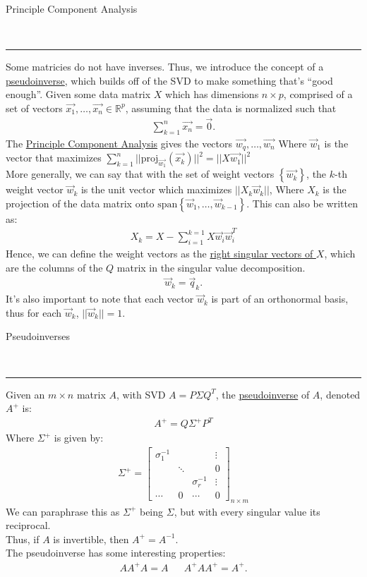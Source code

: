 \documentclass{article}
\newcommand{\header}[1]{\begin{large}\noindent #1\end{large}\\\rule{\textwidth}{0.5pt}}
\newcommand{\gap}{\medskip\\}
\newcommand{\curly}[1]{\left\{#1\right\}}
\newcommand{\proj}[2]{{}\textrm{proj}_{#1}\left(#2\right)}
\begin{document}
\header{Principle Component Analysis}
Some matricies do not have inverses. Thus, we introduce the concept of a \underline{pseudoinverse},
which builds off of the SVD to make something that's ``good enough''.
Given some data matrix $X$ which has dimensions $n \times p$,
comprised of a set of vectors $\vec{x_1}, \ldots, \vec{x_n} \in \mathbb{R}^p$, assuming that the 
data is normalized such that 
\begin{align*}
    \sum_{k = 1}^n \vec{x_n} = \vec{0}.
\end{align*}
The \underline{Principle Component Analysis} gives the vectors $\vec{w_q}, \ldots, \vec{w_n}$
Where $\vec{w}_1$ is the vector that maximizes $\sum_{k = 1}^n ||\proj{\vec{w_1}}{\vec{x_k}}||^2 = ||X\vec{w_1}||^2$
\gap
More generally, we can say that with the set of weight vectors $\curly{\vec{w_k}}$,
the $k$-th weight vector $\vec{w}_k$ is the unit vector which maximizes $||X_k \vec{w}_k||$,
Where $X_k$ is the projection of the data matrix onto $\textrm{span}\curly{\vec{w}_1, \ldots, \vec{w}_{k - 1}}$.
This can also be written as:
\begin{align*}
    X_k = X - \sum_{i = 1}^{k = 1} X\vec{w}_i \vec{w}_i^T
\end{align*}
Hence, we can define the weight vectors as the \underline{right singular vectors of $X$}, 
which are the columns of the $Q$ matrix in the singular value decomposition.
\begin{align*}
    \vec{w}_k = \vec{q}_k.
\end{align*}
It's also important to note that each vector $\vec{w}_k$ is part of an orthonormal basis,
thus for each $\vec{w}_k$, $||\vec{w}_k|| = 1$.
\gap
\header{Pseudoinverses}

Given an $m \times n$ matrix $A$, with SVD $A = P\Sigma Q^T$, the \underline{pseudoinverse}
of $A$, denoted $A^+$ is:
\begin{align*}
    A^+ = Q \Sigma^+ P^T
\end{align*}
Where $\Sigma^+$ is given by:
\begin{align*}
    \Sigma^+ = \begin{bmatrix}
        \sigma_1^{-1} & & & \vdots\\
         & \ddots & & 0\\
         & & \sigma_r^{-1} & \vdots\\
         \cdots & 0 & \cdots & 0  
    \end{bmatrix}_{n \times m}
\end{align*}
We can paraphrase this as $\Sigma^+$ being $\Sigma$, but with every singular value its
reciprocal.
\gap
Thus, if $A$ is invertible, then $A^+ = A^{-1}$.
\gap
The pseudoinverse has some interesting properties:
\begin{align*}
    AA^+A = A && A^+ A A^+ = A^+.
\end{align*}
\end{document}

